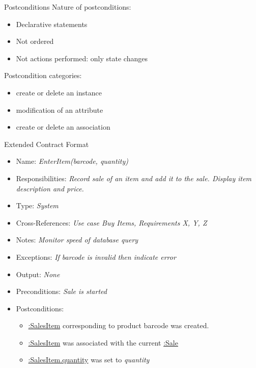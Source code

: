 \documentclass[10pt,t,a4paper]{beamer}
\begin{document}
\begin{frame}[label=sec-1-8]{Postconditions}
Nature of postconditions:
\begin{itemize}
\item Declarative statements
\item Not ordered
\item Not actions performed: only state changes
\end{itemize}

Postcondition categories:     
\begin{itemize}
\item create or delete an instance
\item modification of an attribute
\item create or delete an association
\end{itemize}
\end{frame}
\begin{frame}[label=sec-1-9]{Extended Contract Format}
\begin{itemize}
\item Name: \emph{EnterItem(barcode, quantity)}
\item Responsibilities: \emph{Record sale of an item and add it to the sale. Display item description and price.}
\item Type: \emph{System}
\item Cross-References: \emph{Use case Buy Items, Requirements X, Y, Z}
\item Notes: \emph{Monitor speed of database query}
\item Exceptions: \emph{If barcode is invalid then indicate error}
\item Output: \emph{None}
\item Preconditions: \emph{Sale is started}
\item Postconditions:
\begin{itemize}
\item \uline{:SalesItem} corresponding to product barcode was created.
\item \uline{:SalesItem} was associated with the current \uline{:Sale}
\item \uline{:SalesItem.quantity} was set to \emph{quantity}
\end{itemize}
\end{itemize}
\end{frame}
\end{document}
